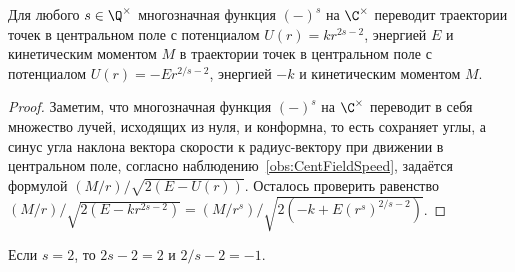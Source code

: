 \documentclass[
	extrafontsizes,
	11pt,
	hyphens,
]{memoir}
\begin{document}

\begin{theorem}
Для любого \(s \in \Q^{\times}\)
многозначная функция \((-)^s\) на \(\C^{\times}\) переводит траектории точек
в центральном поле с потенциалом \(U(r) = k r^{2s-2}\), энергией \(E\) и кинетическим моментом \(M\)%
\label{thm:HookeNewtonTransform}
в траектории точек в центральном поле с потенциалом \(U(r) = - E r^{2/s-2}\), энергией \(- k\) и кинетическим моментом \(M\).
\end{theorem}

\begin{proof}%
Заметим, что многозначная функция \((-)^s\) на \(\C^{\times}\)
переводит в себя множество лучей, исходящих из нуля, и
конформна, то есть сохраняет углы,
а синус угла наклона вектора скорости к радиус-вектору при движении в центральном поле,
согласно наблюдению~\ref{obs:CentFieldSpeed},
задаётся формулой
\((M/r) / \sqrt{2(E - U(r))}\).
Осталось проверить равенство
\(
(M / r) / \sqrt{2(E - k r^{2s-2})}
=
(M / r^s) / \sqrt{2(- k + E (r^s)^{2/s-2})}
\).
\end{proof}


\begin{remark}
Если \(s = 2\), то \(2s - 2 = 2\) и \(2/s - 2 = -1\).
\end{remark}

\end{document}
